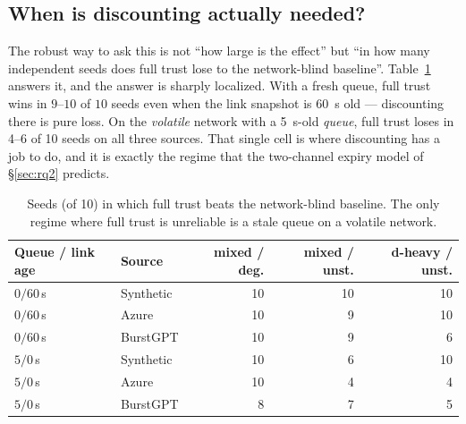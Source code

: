 \subsection{When is discounting actually needed?}
The robust way to ask this is not ``how large is the effect'' but ``in how many independent seeds
does full trust lose to the network-blind baseline''. Table~\ref{tab:seedcount} answers it, and
the answer is sharply localized. With a fresh queue, full trust wins in $9$--$10$ of $10$ seeds
even when the link snapshot is \SI{60}{\second} old --- discounting there is pure loss. On the
\emph{volatile} network with a \SI{5}{\second}-old \emph{queue}, full trust loses in 4--6 of 10
seeds on all three sources. That single cell is where discounting has a job to do, and it is
exactly the regime that the two-channel expiry model of \S\ref{sec:rq2} predicts.

\begin{table}[t]
\centering
\caption{Seeds (of 10) in which full trust beats the network-blind baseline. The only regime
where full trust is unreliable is a stale queue on a volatile network.}
\label{tab:seedcount}
\footnotesize
\setlength{\tabcolsep}{3pt}
\begin{tabular}{@{}llrrr@{}}
\toprule
Queue / link age & Source & mixed / deg. & mixed / unst. & d-heavy / unst. \\
\midrule
$0/60$\,s & Synthetic & 10 & 10 & 10 \\
$0/60$\,s & Azure     & 10 & 9  & 10 \\
$0/60$\,s & BurstGPT  & 10 & 9  & 6  \\
\midrule
$5/0$\,s  & Synthetic & 10 & 6  & 10 \\
$5/0$\,s  & Azure     & 10 & 4  & 4  \\
$5/0$\,s  & BurstGPT  & 8  & 7  & 5  \\
\bottomrule
\end{tabular}
\end{table}

